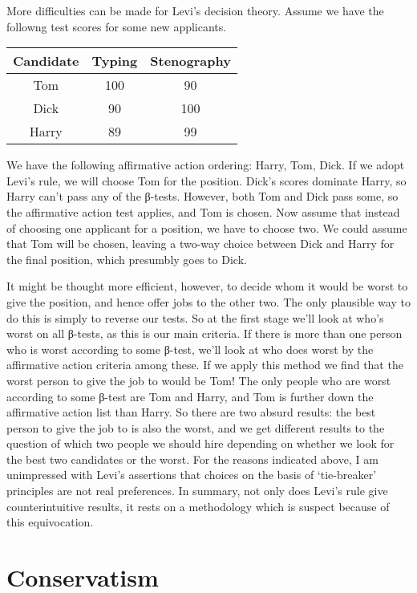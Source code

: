 \documentclass[
  10pt,
  letterpaper,
  DIV=11,
  numbers=noendperiod,
  twoside]{scrartcl}
\begin{document}
More difficulties can be made for Levi's decision theory. Assume we have
the followng test scores for some new applicants.

\begin{longtable}[]{@{}ccc@{}}
\toprule\noalign{}
Candidate & Typing & Stenography \\
\midrule\noalign{}
\endhead
\bottomrule\noalign{}
\endlastfoot
Tom & 100 & 90 \\
Dick & 90 & 100 \\
Harry & 89 & 99 \\
\end{longtable}

We have the following affirmative action ordering: Harry, Tom, Dick. If
we adopt Levi's rule, we will choose Tom for the position. Dick's scores
dominate Harry, so Harry can't pass any of the β-tests. However, both
Tom and Dick pass some, so the affirmative action test applies, and Tom
is chosen. Now assume that instead of choosing one applicant for a
position, we have to choose two. We could assume that Tom will be
chosen, leaving a two-way choice between Dick and Harry for the final
position, which presumbly goes to Dick.

It might be thought more efficient, however, to decide whom it would be
worst to give the position, and hence offer jobs to the other two. The
only plausible way to do this is simply to reverse our tests. So at the
first stage we'll look at who's worst on all β-tests, as this is our
main criteria. If there is more than one person who is worst according
to some β-test, we'll look at who does worst by the affirmative action
criteria among these. If we apply this method we find that the worst
person to give the job to would be Tom! The only people who are worst
according to some β-test are Tom and Harry, and Tom is further down the
affirmative action list than Harry. So there are two absurd results: the
best person to give the job to is also the worst, and we get different
results to the question of which two people we should hire depending on
whether we look for the best two candidates or the worst. For the
reasons indicated above, I am unimpressed with Levi's assertions that
choices on the basis of `tie-breaker' principles are not real
preferences. In summary, not only does Levi's rule give counterintuitive
results, it rests on a methodology which is suspect because of this
equivocation.

\section{Conservatism}\label{conservatism}
\end{document}

